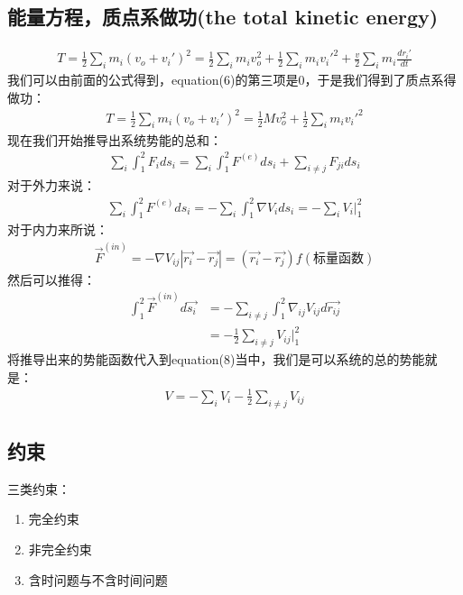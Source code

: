 \documentclass[UTF8,10pt]{article}
\begin{document}
\subsection{能量方程，质点系做功(the total kinetic energy)}
\begin{align}
    T=\frac{1}{2}\sum_i m_i (v_o+v_i')^2=\frac{1}{2}\sum_i m_i v_o^2+\frac{1}{2}
    \sum_i m_i v_i'^2+\frac{v}{2}\sum_i m_i \frac{dr_i'}{dt}
\end{align}
我们可以由前面的公式得到，equation(6)的第三项是0，于是我们得到了质点系得做功：
\begin{align}
    T=\frac{1}{2}\sum_i m_i (v_o+v_i')^2=\frac{1}{2}M v_o^2+\frac{1}{2}
    \sum_i m_i v_i'^2
\end{align}
现在我们开始推导出系统势能的总和：
\begin{align}
    \sum_i \int_{1}^{2 } F_i ds_i = \sum_i \int _{1}^{2} F^{(e)} ds_i +\sum
    _{i\neq j} F_{ji}ds_i
\end{align}
对于外力来说：
\begin{align}
    \sum_i \int _{1}^{2} F^{(e)} ds_i =-\sum_i \int_{1}^{2}  \nabla V_i d s_i=
    -\sum_iV_{i}|_{1}^{2}
\end{align}
对于内力来所说：
\begin{align}
    \vec{F}^{(in)}=-\nabla V_{ij}|\vec{r_i}-\vec{r_j}|= (\vec{r_i}-\vec{r_j})f(\text{标量函数})
\end{align}
然后可以推得：
\begin{align*}
    \int _{1}^{2} \vec{F}^{(in)} d\vec{s_i} & = -\sum_{i\neq j}\int_{1}^{2} \nabla_{ij} V_{ij}
    d\vec{r_{ij}}                                                                              \\
                                            & = -\frac{1}{2}\sum_{i\neq j} V_{ij}|_{1}^{2}
\end{align*}
将推导出来的势能函数代入到equation(8)当中，我们是可以系统的总的势能就是：
\begin{align*}
    V = -\sum_i V_i -\frac{1}{2}\sum_{i\neq j}V_{ij}
\end{align*}
\subsection{约束}
三类约束：
\begin{enumerate}
    \item 完全约束
    \item 非完全约束
    \item 含时问题与不含时间问题
\end{enumerate}
\end{document}
